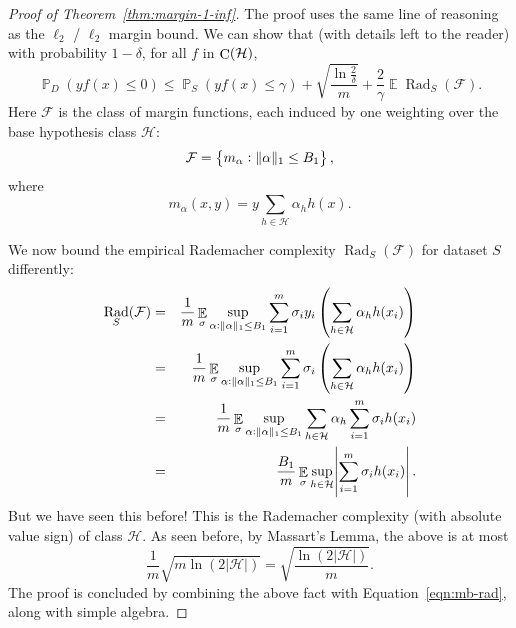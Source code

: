 \documentclass{article}
\DeclareMathOperator{\Rad}{{\mathrm{Rad}}}
\DeclareMathOperator*{\C}{{\rm C}}
\DeclareMathOperator{\EE}{{\mathbb E}}
\DeclareMathOperator{\PP}{{\mathbb P}}
\newcommand{\Hcal}{\mathcal{H}}
\newcommand{\Fcal}{\mathcal{F}}
\begin{document}






\begin{proof}[Proof of Theorem~\ref{thm:margin-1-inf}]
The proof uses the same line of reasoning as the $\ell_2$ / $\ell_2$ margin bound. We can show that (with details left to the reader) with probability $1-\delta$, for all $f$ in $\C(\Hcal)$,
\begin{equation}
  \PP_D(y f(x) \leq 0) \leq \PP_S(y f(x) \leq \gamma) +
\sqrt{\frac{\ln\frac{2}{\delta}}{m}} + \frac{2}{\gamma} \EE \Rad_S(\Fcal).
\label{eqn:mb-rad}
\end{equation}
Here $\Fcal$ is the class of margin functions, each induced by one weighting over the base hypothesis class $\Hcal$:
\[ \Fcal = \cbr{m_\alpha: \|\alpha\|_1 \leq B_1}, \]
where
\[ m_\alpha(x,y) = y \sum_{h \in \Hcal} \alpha_h h(x). \]

We now bound the empirical Rademacher complexity $\Rad_S(\Fcal)$ for dataset $S$ differently:
\begin{eqnarray*}
\Rad_S(\Fcal)
&=& \frac1m \EE_\sigma \sup_{\alpha: \|\alpha\|_1 \leq B_1} \sum_{i=1}^m \sigma_i y_i \del{\sum_{h \in \Hcal} \alpha_h h(x_i)} \\
&=& \frac1m \EE_\sigma \sup_{\alpha: \|\alpha\|_1 \leq B_1} \sum_{i=1}^m \sigma_i \del{\sum_{h \in \Hcal} \alpha_h h(x_i)} \\
&=& \frac1m \EE_\sigma \sup_{\alpha: \|\alpha\|_1 \leq B_1} \sum_{h \in \Hcal} \alpha_h \sum_{i=1}^m \sigma_i h(x_i) \\
&=& \frac{B_1}m \EE_\sigma \sup_{h \in \Hcal} \abs{\sum_{i=1}^m \sigma_i h(x_i)}.
\end{eqnarray*}
But we have seen this before! This is the Rademacher complexity (with absolute value sign) of class $\Hcal$. As seen before, by Massart's Lemma, the above is at most
\[ \frac1m \sqrt{m \ln(2|\Hcal|)} = \sqrt{\frac{\ln(2|\Hcal|)}m}. \]
The proof is concluded by combining the above fact with Equation~\eqref{eqn:mb-rad}, along with simple algebra.
\end{proof}



\end{document}
